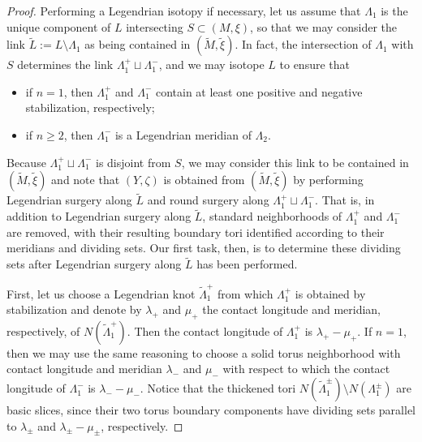 \documentclass[11pt]{amsart}
\numberwithin{equation}{section}
\theoremstyle{plain}
\theoremstyle{definition}
\theoremstyle{remark}\newtheorem{rem}[equation]{Remark}%
\theoremstyle{remark}\newtheorem{obs}[equation]{Observation}%
\begin{document}
\begin{proof}
Performing a Legendrian isotopy if necessary, let us assume that $\Lambda_1$ is the unique component of $L$ intersecting $S\subset(M,\xi)$, so that we may consider the link $\tilde{L}:=L\setminus\Lambda_1$ as being contained in $(\tilde{M},\tilde{\xi})$.  In fact, the intersection of $\Lambda_1$ with $S$ determines the link $\Lambda_1^+\sqcup\Lambda_1^-$, and we may isotope $L$ to ensure that
\begin{itemize}
    \item if $n=1$, then $\Lambda_1^+$ and $\Lambda_1^-$ contain at least one positive and negative stabilization, respectively;
    \item if $n\geq 2$, then $\Lambda_1^-$ is a Legendrian meridian of $\Lambda_2$.
\end{itemize}
Because $\Lambda_1^+\sqcup\Lambda_1^-$ is disjoint from $S$, we may consider this link to be contained in $(\tilde{M},\tilde{\xi})$ and note that $(Y,\zeta)$ is obtained from $(\tilde{M},\tilde{\xi})$ by performing Legendrian surgery along $\tilde{L}$ and round surgery along $\Lambda_1^+\sqcup\Lambda_1^-$.  That is, in addition to Legendrian surgery along $\tilde{L}$, standard neighborhoods of $\Lambda_1^+$ and $\Lambda_1^-$ are removed, with their resulting boundary tori identified according to their meridians and dividing sets.  Our first task, then, is to determine these dividing sets after Legendrian surgery along $\tilde{L}$ has been performed.

First, let us choose a Legendrian knot $\tilde{\Lambda}_1^+$ from which $\Lambda_1^+$ is obtained by stabilization and denote by $\lambda_+$ and $\mu_+$ the contact longitude and meridian, respectively, of $N(\tilde{\Lambda}_1^+)$.  Then the contact longitude of $\Lambda_1^+$ is $\lambda_+-\mu_+$.  If $n=1$, then we may use the same reasoning to choose a solid torus neighborhood with contact longitude and meridian $\lambda_-$ and $\mu_-$ with respect to which the contact longitude of $\Lambda_1^-$ is $\lambda_--\mu_-$.  Notice that the thickened tori $N(\tilde{\Lambda}_1^\pm)\setminus N(\Lambda_1^\pm)$ are basic slices, since their two torus boundary components have dividing sets parallel to $\lambda_\pm$ and $\lambda_\pm-\mu_\pm$, respectively.


\end{proof}
\end{document}
